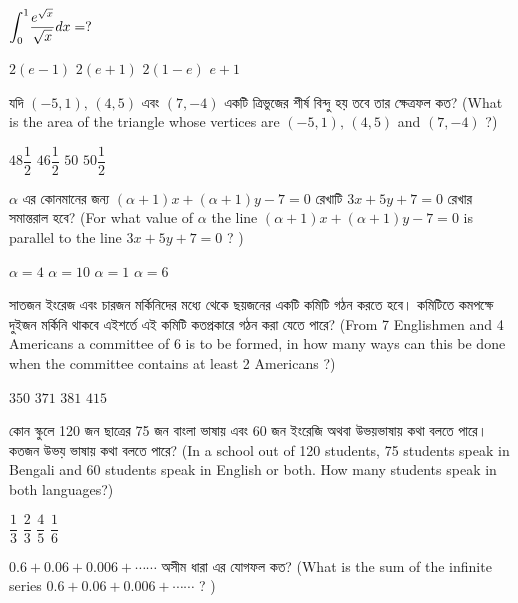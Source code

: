 \documentclass[addpoints]{exam}
\begin{document}
\begin{questions}
\question  $ \mathlarger{\int_{0}^{1}}\dfrac{e^{\sqrt{x}}}{\sqrt{x}}dx=? $

\begin{oneparchoices}
\choice  $ 2(e-1) $
\choice  $ 2(e+1) $
\choice  $ 2(1-e) $
\choice  $ e+1 $
\end{oneparchoices}

\question  যদি $ (-5,1),\,(4,5) $ এবং $ (7,-4) $ একটি ত্রিভুজের শীর্ষ বিন্দু হয় তবে তার ক্ষেত্রফল কত? (What is the area of the triangle whose vertices are $ (-5,1),\,(4,5) $ and  $ (7,-4) $ ?)


\begin{oneparchoices}
\choice $ 48\dfrac{1}{2} $
\choice $ 46\dfrac{1}{2} $
\choice $ 50 $
\choice  $ 50\dfrac{1}{2} $
\end{oneparchoices}

\question $ \alpha $ এর কোনমানের জন্য $ (\alpha+1)x+(\alpha +1)y-7=0 $ রেখাটি $ 3x+5y+7=0 $ রেখার সমান্তরাল হবে? (For what value of $ \alpha $ the line $ (\alpha+1)x+(\alpha +1)y-7=0 $ is parallel to the line $ 3x+5y+7=0 $ ? )

\begin{oneparchoices}
\choice $ \alpha = 4 $
\choice $ \alpha = 10 $
\choice $ \alpha = 1 $
\choice $ \alpha = 6 $  
\end{oneparchoices}

\question সাতজন ইংরেজ এবং চারজন মর্কিনিদের মধ্যে থেকে ছয়জনের একটি কমিটি গঠন করতে হবে। কমিটিতে কমপক্ষে দুইজন মর্কিনি থাকবে এইশর্তে এই কমিটি কতপ্রকারে গঠন করা যেতে পারে? (From 7 Englishmen and 4 Americans a committee of 6 is to be formed, in how many ways can this be done when the committee contains at least 2 Americans ?)

\begin{oneparchoices}
\choice $ 350 $
\choice $ 371 $
\choice $ 381 $
\choice $ 415 $
\end{oneparchoices}

\question কোন স্কুলে 120 জন ছাত্রের 75 জন বাংলা ভাষায় এবং 60 জন ইংরেজি অথবা উভয়ভাষায় কথা বলতে পারে। কতজন উভয় ভাষায় কথা বলতে পারে? (In a school out of 120 students, 75 students speak in Bengali and 60 students speak in English or both. How many students speak in both languages?)

\begin{oneparchoices}
\choice $ \dfrac{1}{3} $
\choice $ \dfrac{2}{3} $
\choice $ \dfrac{4}{5} $
\choice $ \dfrac{1}{6} $
\end{oneparchoices}

\question $ 0.6+0.06+0.006+ \cdots \cdots $ অসীম ধারা এর যোগফল কত? (What is the sum of the infinite series $ 0.6+0.06+0.006+ \cdots \cdots $ ? )



\end{questions}
\end{document}

